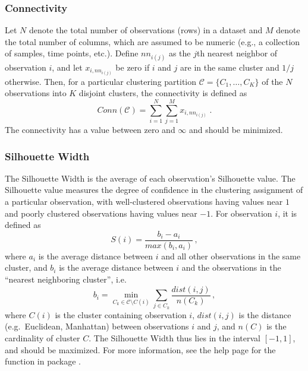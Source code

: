 \documentclass[11pt]{article}
\begin{document}
\subsubsection*{Connectivity}

Let $N$ denote the total number of observations (rows) in a dataset
and $M$ denote the total number of columns, which are assumed to be
numeric (e.g., a collection of samples, time points, etc.).
Define $nn_{i(j)}$ as the $j$th nearest neighbor of observation $i$, and
let $x_{i,nn_{i(j)}}$ be zero if $i$ and $j$ are in the same cluster and
$1/j$ otherwise.  Then, for a particular clustering partition
$\mathcal{C} = \{C_1, \ldots, C_K\}$ of the $N$ observations into $K$
disjoint clusters, the connectivity is defined as 
$$
Conn(\mathcal{C}) = \sum\limits_{i=1}^N\sum\limits_{j=1}^M x_{i,nn_{i(j)}} \;.
$$
The connectivity has a value between zero and $\infty$ and should be minimized.

\subsubsection*{Silhouette Width}

The Silhouette Width is the average of each observation's Silhouette
value.
The Silhouette value  measures the
degree of confidence in the clustering assignment of a particular
observation, with
well-clustered observations having values
near $1$ and poorly clustered observations having values near $-1$.  For
observation $i$, it is defined as
$$ 
S(i) = \frac{b_i - a_i}{max(b_i, a_i)}\,,
$$
where $a_i$ is the average distance between $i$ and all other
observations in the same cluster, and $b_i$ is the average distance
between $i$ and the observations in the ``nearest neighboring
cluster'', i.e. %
$$
b_i = \min\limits_{C_k \in \mathcal{C}\setminus C(i)} \sum\limits_{j \in C_k}\frac{dist(i,j)}{n(C_k)}\,,
$$
where $C(i)$ is the cluster containing observation $i$, $dist(i,j)$ is
the distance (e.g.~Euclidean, Manhattan) between observations $i$ and $j$, and $n(C)$ is the
cardinality of cluster $C$.  The Silhouette Width thus lies in the interval
$[-1,1]$, and should be maximized.  
For more information, see the help page for the 
function in package  \citep{cluster}.
\end{document}
